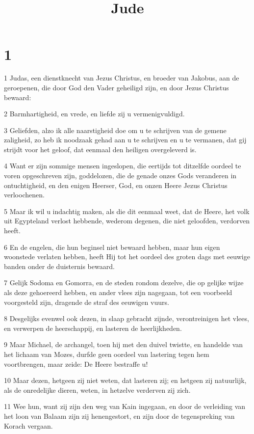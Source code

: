 

\title{Jude}



\chapter{1}

\par 1 Judas, een dienstknecht van Jezus Christus, en broeder van Jakobus, aan de geroepenen, die door God den Vader geheiligd zijn, en door Jezus Christus bewaard:
\par 2 Barmhartigheid, en vrede, en liefde zij u vermenigvuldigd.
\par 3 Geliefden, alzo ik alle naarstigheid doe om u te schrijven van de gemene zaligheid, zo heb ik noodzaak gehad aan u te schrijven en u te vermanen, dat gij strijdt voor het geloof, dat eenmaal den heiligen overgeleverd is.
\par 4 Want er zijn sommige mensen ingeslopen, die eertijds tot ditzelfde oordeel te voren opgeschreven zijn, goddelozen, die de genade onzes Gods veranderen in ontuchtigheid, en den enigen Heerser, God, en onzen Heere Jezus Christus verloochenen.
\par 5 Maar ik wil u indachtig maken, als die dit eenmaal weet, dat de Heere, het volk uit Egypteland verlost hebbende, wederom degenen, die niet geloofden, verdorven heeft.
\par 6 En de engelen, die hun beginsel niet bewaard hebben, maar hun eigen woonstede verlaten hebben, heeft Hij tot het oordeel des groten dags met eeuwige banden onder de duisternis bewaard.
\par 7 Gelijk Sodoma en Gomorra, en de steden rondom dezelve, die op gelijke wijze als deze gehoereerd hebben, en ander vlees zijn nagegaan, tot een voorbeeld voorgesteld zijn, dragende de straf des eeuwigen vuurs.
\par 8 Desgelijks evenwel ook dezen, in slaap gebracht zijnde, verontreinigen het vlees, en verwerpen de heerschappij, en lasteren de heerlijkheden.
\par 9 Maar Michael, de archangel, toen hij met den duivel twistte, en handelde van het lichaam van Mozes, durfde geen oordeel van lastering tegen hem voortbrengen, maar zeide: De Heere bestraffe u!
\par 10 Maar dezen, hetgeen zij niet weten, dat lasteren zij; en hetgeen zij natuurlijk, als de onredelijke dieren, weten, in hetzelve verderven zij zich.
\par 11 Wee hun, want zij zijn den weg van Kain ingegaan, en door de verleiding van het loon van Balaam zijn zij henengestort, en zijn door de tegenspreking van Korach vergaan.
